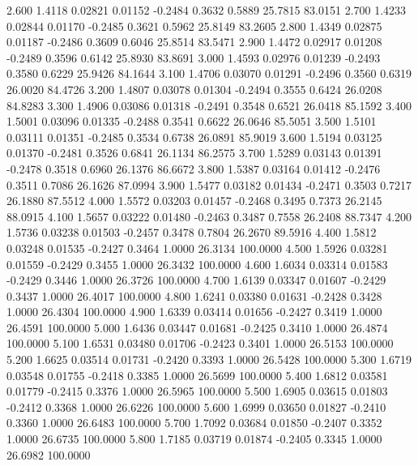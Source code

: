    2.600   1.4118   0.02821   0.01152  -0.2484   0.3632   0.5889  25.7815  83.0151
   2.700   1.4233   0.02844   0.01170  -0.2485   0.3621   0.5962  25.8149  83.2605
   2.800   1.4349   0.02875   0.01187  -0.2486   0.3609   0.6046  25.8514  83.5471
   2.900   1.4472   0.02917   0.01208  -0.2489   0.3596   0.6142  25.8930  83.8691
   3.000   1.4593   0.02976   0.01239  -0.2493   0.3580   0.6229  25.9426  84.1644
   3.100   1.4706   0.03070   0.01291  -0.2496   0.3560   0.6319  26.0020  84.4726
   3.200   1.4807   0.03078   0.01304  -0.2494   0.3555   0.6424  26.0208  84.8283
   3.300   1.4906   0.03086   0.01318  -0.2491   0.3548   0.6521  26.0418  85.1592
   3.400   1.5001   0.03096   0.01335  -0.2488   0.3541   0.6622  26.0646  85.5051
   3.500   1.5101   0.03111   0.01351  -0.2485   0.3534   0.6738  26.0891  85.9019
   3.600   1.5194   0.03125   0.01370  -0.2481   0.3526   0.6841  26.1134  86.2575
   3.700   1.5289   0.03143   0.01391  -0.2478   0.3518   0.6960  26.1376  86.6672
   3.800   1.5387   0.03164   0.01412  -0.2476   0.3511   0.7086  26.1626  87.0994
   3.900   1.5477   0.03182   0.01434  -0.2471   0.3503   0.7217  26.1880  87.5512
   4.000   1.5572   0.03203   0.01457  -0.2468   0.3495   0.7373  26.2145  88.0915
   4.100   1.5657   0.03222   0.01480  -0.2463   0.3487   0.7558  26.2408  88.7347
   4.200   1.5736   0.03238   0.01503  -0.2457   0.3478   0.7804  26.2670  89.5916
   4.400   1.5812   0.03248   0.01535  -0.2427   0.3464   1.0000  26.3134 100.0000
   4.500   1.5926   0.03281   0.01559  -0.2429   0.3455   1.0000  26.3432 100.0000
   4.600   1.6034   0.03314   0.01583  -0.2429   0.3446   1.0000  26.3726 100.0000
   4.700   1.6139   0.03347   0.01607  -0.2429   0.3437   1.0000  26.4017 100.0000
   4.800   1.6241   0.03380   0.01631  -0.2428   0.3428   1.0000  26.4304 100.0000
   4.900   1.6339   0.03414   0.01656  -0.2427   0.3419   1.0000  26.4591 100.0000
   5.000   1.6436   0.03447   0.01681  -0.2425   0.3410   1.0000  26.4874 100.0000
   5.100   1.6531   0.03480   0.01706  -0.2423   0.3401   1.0000  26.5153 100.0000
   5.200   1.6625   0.03514   0.01731  -0.2420   0.3393   1.0000  26.5428 100.0000
   5.300   1.6719   0.03548   0.01755  -0.2418   0.3385   1.0000  26.5699 100.0000
   5.400   1.6812   0.03581   0.01779  -0.2415   0.3376   1.0000  26.5965 100.0000
   5.500   1.6905   0.03615   0.01803  -0.2412   0.3368   1.0000  26.6226 100.0000
   5.600   1.6999   0.03650   0.01827  -0.2410   0.3360   1.0000  26.6483 100.0000
   5.700   1.7092   0.03684   0.01850  -0.2407   0.3352   1.0000  26.6735 100.0000
   5.800   1.7185   0.03719   0.01874  -0.2405   0.3345   1.0000  26.6982 100.0000
